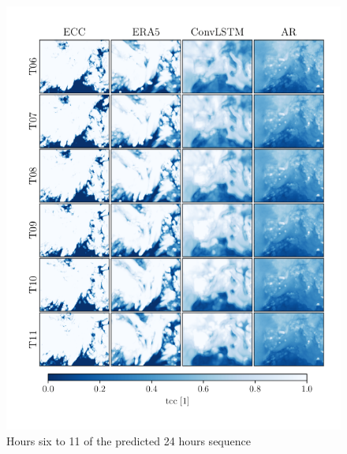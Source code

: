 \begin{figure}[ht]
    \centering
    \includegraphics{python_figs/comparing_seq_part_2_of4_jan2.png}
    \caption{Hours six to 11 of the predicted 24 hours sequence }
    \label{fig:part2/4}
\end{figure}
